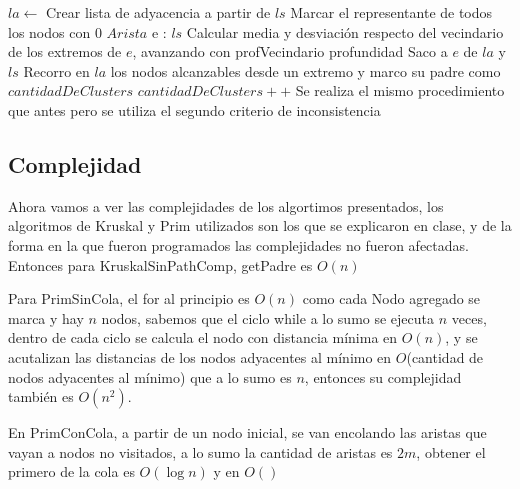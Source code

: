 \documentclass[11pt,a4paper]{article}
\begin{document}
\begin{codebox}
\li $la \gets $ Crear lista de adyacencia a partir de $ls$
\li Marcar el representante de todos los nodos con $0$
\li 
\li \For $Arista$ e : $ls$ \Do
\li 	{} \Then
\li			{} \Then
\li 			Calcular media y desviación respecto del vecindario de los 
\zi				extremos de $e$, avanzando con profVecindario profundidad
\li 			{} \Then
\li 				Saco a $e$ de $la$ y $ls$
\li 				Recorro en $la$ los nodos alcanzables desde un extremo y marco
\zi					su padre como $cantidadDeClusters$
\li 				$cantidadDeClusters++$
				\End
\li 		\Else
\li				Se realiza el mismo procedimiento que antes pero se utiliza 
\zi 			el segundo criterio de inconsistencia
			\End
		\End
	\End
\end{codebox}

\subsection{Complejidad}
Ahora vamos a ver las complejidades de los algortimos presentados, los algoritmos de Kruskal y Prim utilizados son los que se explicaron en clase, y de la forma en la que fueron programados las complejidades no fueron afectadas.
\\
Entonces para KruskalSinPathComp, getPadre es $O(n)$

Para PrimSinCola, el for al principio es $O(n)$ como cada Nodo agregado se marca y hay $n$ nodos, sabemos que el ciclo while a lo sumo se ejecuta $n$ veces, dentro de cada ciclo se calcula el nodo con distancia mínima en $O(n)$, y se acutalizan las distancias de los nodos adyacentes al mínimo en $O$(cantidad de nodos adyacentes al mínimo) que a lo sumo es $n$, entonces su complejidad también es $O(n^2)$.

En PrimConCola, a partir de un nodo inicial, se van encolando las aristas que vayan a nodos no visitados, a lo sumo la cantidad de aristas es $2m$, obtener el primero de la cola es $O(\log n)$ y en $O()$
\end{document}
